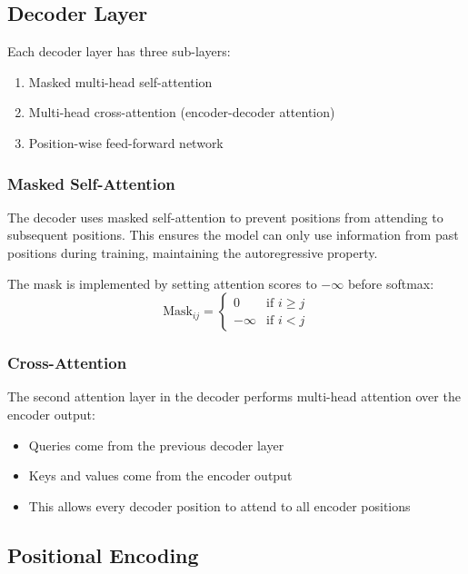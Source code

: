 \documentclass[11pt]{article}
\begin{document}
\subsection{Decoder Layer}

Each decoder layer has three sub-layers:
\begin{enumerate}
    \item Masked multi-head self-attention
    \item Multi-head cross-attention (encoder-decoder attention)
    \item Position-wise feed-forward network
\end{enumerate}

\subsubsection{Masked Self-Attention}

The decoder uses masked self-attention to prevent positions from attending to subsequent positions. This ensures the model can only use information from past positions during training, maintaining the autoregressive property.

The mask is implemented by setting attention scores to $-\infty$ before softmax:
\begin{equation}
\text{Mask}_{ij} = \begin{cases}
0 & \text{if } i \geq j \\
-\infty & \text{if } i < j
\end{cases}
\end{equation}

\subsubsection{Cross-Attention}

The second attention layer in the decoder performs multi-head attention over the encoder output:
\begin{itemize}
    \item Queries come from the previous decoder layer
    \item Keys and values come from the encoder output
    \item This allows every decoder position to attend to all encoder positions
\end{itemize}

\subsection{Positional Encoding}
\end{document}
